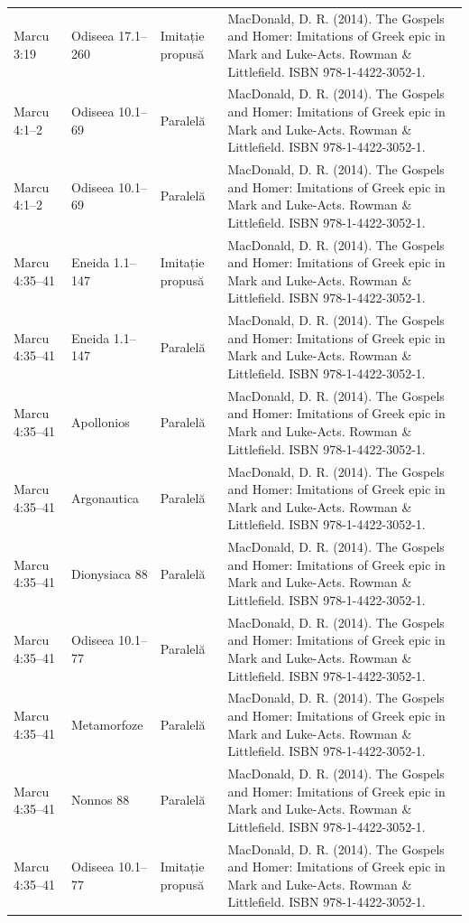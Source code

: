 \documentclass[12pt,a4paper,twoside,openany]{book}
\begin{document}
\begin{longtable}{L{1.4cm}L{1.7cm}L{3.1cm}L{8.4cm}}
Marcu 3:19 & Odiseea 17.1–260 & Imitație propusă & MacDonald, D. R. (2014). The Gospels and Homer: Imitations of Greek epic in Mark and Luke-Acts. Rowman \& Littlefield. ISBN 978-1-4422-3052-1. \\
Marcu 4:1–2 & Odiseea 10.1–69 & Paralelă & MacDonald, D. R. (2014). The Gospels and Homer: Imitations of Greek epic in Mark and Luke-Acts. Rowman \& Littlefield. ISBN 978-1-4422-3052-1. \\
Marcu 4:1–2 & Odiseea 10.1–69 & Paralelă & MacDonald, D. R. (2014). The Gospels and Homer: Imitations of Greek epic in Mark and Luke-Acts. Rowman \& Littlefield. ISBN 978-1-4422-3052-1. \\
Marcu 4:35–41 & Eneida 1.1–147 & Imitație propusă & MacDonald, D. R. (2014). The Gospels and Homer: Imitations of Greek epic in Mark and Luke-Acts. Rowman \& Littlefield. ISBN 978-1-4422-3052-1. \\
Marcu 4:35–41 & Eneida 1.1–147 & Paralelă & MacDonald, D. R. (2014). The Gospels and Homer: Imitations of Greek epic in Mark and Luke-Acts. Rowman \& Littlefield. ISBN 978-1-4422-3052-1. \\
Marcu 4:35–41 & Apollonios & Paralelă & MacDonald, D. R. (2014). The Gospels and Homer: Imitations of Greek epic in Mark and Luke-Acts. Rowman \& Littlefield. ISBN 978-1-4422-3052-1. \\
Marcu 4:35–41 & Argonautica & Paralelă & MacDonald, D. R. (2014). The Gospels and Homer: Imitations of Greek epic in Mark and Luke-Acts. Rowman \& Littlefield. ISBN 978-1-4422-3052-1. \\
Marcu 4:35–41 & Dionysiaca 88 & Paralelă & MacDonald, D. R. (2014). The Gospels and Homer: Imitations of Greek epic in Mark and Luke-Acts. Rowman \& Littlefield. ISBN 978-1-4422-3052-1. \\
Marcu 4:35–41 & Odiseea 10.1–77 & Paralelă & MacDonald, D. R. (2014). The Gospels and Homer: Imitations of Greek epic in Mark and Luke-Acts. Rowman \& Littlefield. ISBN 978-1-4422-3052-1. \\
Marcu 4:35–41 & Metamorfoze & Paralelă & MacDonald, D. R. (2014). The Gospels and Homer: Imitations of Greek epic in Mark and Luke-Acts. Rowman \& Littlefield. ISBN 978-1-4422-3052-1. \\
Marcu 4:35–41 & Nonnos 88 & Paralelă & MacDonald, D. R. (2014). The Gospels and Homer: Imitations of Greek epic in Mark and Luke-Acts. Rowman \& Littlefield. ISBN 978-1-4422-3052-1. \\
Marcu 4:35–41 & Odiseea 10.1–77 & Imitație propusă & MacDonald, D. R. (2014). The Gospels and Homer: Imitations of Greek epic in Mark and Luke-Acts. Rowman \& Littlefield. ISBN 978-1-4422-3052-1. \\

\end{longtable}
\end{document}
